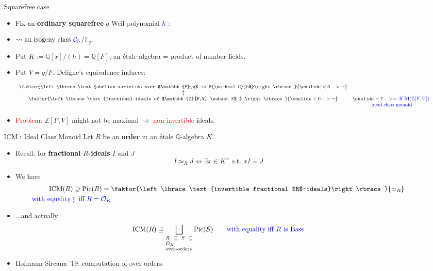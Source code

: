 \documentclass[usenames,dvipsnames]{beamer}
\def\Q{\mathbb{Q}}
\def\Z{\mathbb{Z}}
\def\F{\mathbb{F}}
\DeclareMathOperator{\ICM}{ICM}
\DeclareMathOperator{\Pic}{Pic}
\newcommand{\cC}{{\mathcal C}}
\newcommand{\cO}{{\mathcal O}}
\newcommand{\set}[1]{\left\lbrace#1\right\rbrace }
\newcommand{\red}[1]{\textcolor{red}{#1}}
\newcommand{\blue}[1]{\textcolor{blue}{#1}}
\begin{document}
\begin{frame}{Squarefree case}
	\begin{itemize}
	\item Fix an \textbf{ordinary squarefree} $q$-Weil polynomial \blue{$h$} :
    \item  $\rightsquigarrow \text{an isogeny class } \blue{\cC_h}$/$\F_q$.
    \item Put $K := \Q[x]/(h)=\Q[F]$, an \'etale algebra = product of number fields.
	\item Put $V=q/F$. Deligne's equivalence induces:
			\begin{theorem}
			\[\begin{array}{cc}
			\faktor{\set{\text{abelian varieties over $\F_q$ in $\cC_h$}}}{
\onslide<6->{\simeq}
            } & \\
			\updownarrow & \\
			\faktor{\set{ \text{fractional ideals of $\Z[F,V] \subset K$ } }}{
\onslide<6->{\simeq}
             } &
\onslide<7-> =:  \blue{\ICM(\Z[F,V])}\\ 
			& \blue{\text{ ideal class monoid} }
			  \end{array}\]
			\end{theorem}
    \item \red{Problem:} $\Z[F,V]$ might not be maximal $\rightsquigarrow $ \red{non-invertible} ideals.
	\end{itemize}
\end{frame}

\begin{frame}{ICM : Ideal Class Monoid}
    Let $R$ be an {\bf order} in an \'etale  $\Q$-algebra $K$.
    \begin{itemize}
\pause
    \item Recall: for {\bf fractional $R$-ideals} $I$ and $J$
	 \[ I\simeq_R J \Longleftrightarrow \exists x \in K^\times \text{ s.t.~} xI=J \]
\pause
    \item We have
   	\begin{align*}
    \ICM(R) & \supseteq \Pic(R)=\faktor{\set{\text{invertible fractional $R$-ideals}}}{\simeq_R} \\
	\blue{\text{with equality }} & \blue{\rotatebox[origin=c]{90}{$\large\rightsquigarrow$}\mkern2mu \text{ iff } R=\cO_K }
    \end{align*}
\pause 
    \item ...and actually
    \[ \ICM(R) \supseteq \bigsqcup_{\scriptsize\parbox{5 em}{$R\subseteq S \subseteq \cO_K$\\over-orders}}\Pic(S) \qquad   
     \textcolor{blue}{\text{with equality iff $R$ is Bass}} \]
\pause
    \item Hofmann-Sircana '19: computation of over-orders.
\end{itemize}
\end{frame}
\end{document}
